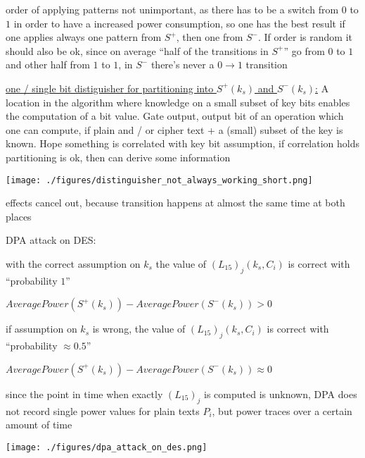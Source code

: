 \documentclass[landscape, a4paper]{article}
\begin{document}
\begin{minipage}[t]{0.2\linewidth}
\begin{betterlist}
\begin{betterlist}
			\item order of applying patterns not unimportant, as there has to be a switch from $0$ to $1$ in order to have a increased power consumption, so one has the best result if one applies always one pattern from $S^+$, then one from $S^-$. If order is random it should also be ok, since on average \enquote{half of the transitions in $S^+$} go from $0$ to $1$ and other half from $1$ to $1$, in $S^-$ there's never a $0\rightarrow 1$ transition
			\item \underline{\alert{one / single bit distiguisher} for partitioning into $S^+(k_s)$ and $S^−(k_s)$:} A location in the algorithm where knowledge on a small subset of key bits enables the computation of a bit value. Gate output, output bit of an operation which one can compute, if plain and / or cipher text + a (small) subset of the key is known. Hope something is correlated with key bit assumption, if correlation holds partitioning is ok, then can derive some information

			\texttt{[image: ./figures/distinguisher\_not\_always\_working\_short.png]}
			\begin{betterlist}
				\item effects cancel out, because transition happens at almost the same time at both places
			\end{betterlist}
			\item \alert{DPA attack on DES:}
			\begin{betterlist}
				\item with the correct assumption on $k_s$ the value of $(L_{15})_j (k_s, C_i)$ is correct with \enquote{probability $1$}
				\begin{betterlist}
					\item $AveragePower(S^+(k_s)) - AveragePower(S^−(k_s)) > 0$
				\end{betterlist}
				\item if assumption on $k_s$ is wrong, the value of $(L_{15})_j (k_s, C_i)$ is correct with \enquote{probability $\approx 0.5$}
				\begin{betterlist}
					\item $AveragePower(S^+(k_s)) - AveragePower(S^−(k_s)) \approx 0$
				\end{betterlist}
				\item since the point in time when exactly $(L_{15})_j$ is computed is unknown, DPA does not record \alert{single power values} for plain texts $P_i$, but \alert{power traces} over a certain amount of time
			\end{betterlist}
			\texttt{[image: ./figures/dpa\_attack\_on\_des.png]}


\end{betterlist}
\end{betterlist}
\end{minipage}
\end{document}
